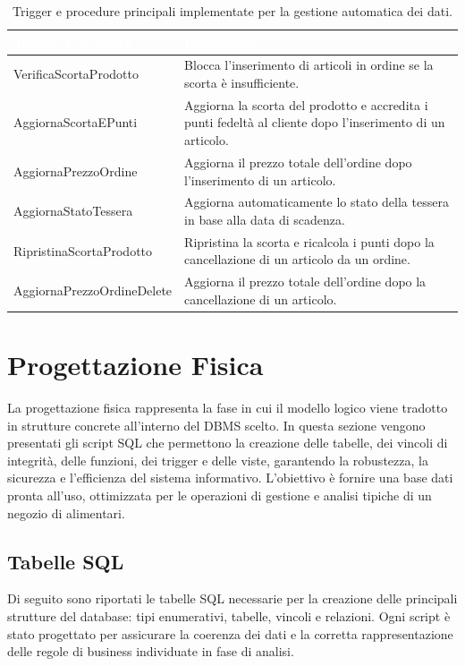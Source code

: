 \documentclass[a4paper,12pt]{article}
\begin{document}
\renewcommand{\arraystretch}{1.3}
\begin{table}[htbp]
\centering
\setlength{\tabcolsep}{8pt}
\begin{tabular}{|>{\centering\arraybackslash}m{4cm}|>{\raggedright\arraybackslash}m{9cm}|}
\hline
\rowcolor{myblue}\textcolor{white}{\textbf{Trigger/Procedura}} & \textcolor{white}{\textbf{Descrizione}} \\
\hline
\rowcolor{mygray} VerificaScortaProdotto & Blocca l’inserimento di articoli in ordine se la scorta è insufficiente. \\
AggiornaScortaEPunti & Aggiorna la scorta del prodotto e accredita i punti fedeltà al cliente dopo l’inserimento di un articolo. \\
\rowcolor{mygray} AggiornaPrezzoOrdine & Aggiorna il prezzo totale dell’ordine dopo l’inserimento di un articolo. \\
AggiornaStatoTessera & Aggiorna automaticamente lo stato della tessera in base alla data di scadenza. \\
\rowcolor{mygray} RipristinaScortaProdotto & Ripristina la scorta e ricalcola i punti dopo la cancellazione di un articolo da un ordine. \\
AggiornaPrezzoOrdineDelete & Aggiorna il prezzo totale dell’ordine dopo la cancellazione di un articolo. \\
\hline
\end{tabular}
\caption{Trigger e procedure principali implementate per la gestione automatica dei dati.}
\end{table}

\newpage
\section{Progettazione Fisica}

\noindent
La progettazione fisica rappresenta la fase in cui il modello logico viene tradotto in strutture concrete all’interno del DBMS scelto. In questa sezione vengono presentati gli script SQL che permettono la creazione delle tabelle, dei vincoli di integrità, delle funzioni, dei trigger e delle viste, garantendo la robustezza, la sicurezza e l’efficienza del sistema informativo. L’obiettivo è fornire una base dati pronta all’uso, ottimizzata per le operazioni di gestione e analisi tipiche di un negozio di alimentari.

\subsection{Tabelle SQL}
\noindent
Di seguito sono riportati le tabelle SQL necessarie per la creazione delle principali strutture del database: tipi enumerativi, tabelle, vincoli e relazioni. Ogni script è stato progettato per assicurare la coerenza dei dati e la corretta rappresentazione delle regole di business individuate in fase di analisi.
\end{document}
